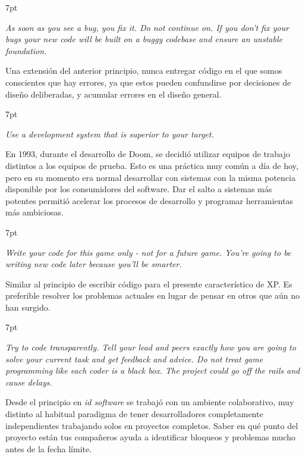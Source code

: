 \documentclass[a4paper,12pt]{report}
\newenvironment{formal}{%
	\def\FrameCommand{%
		\hspace{1pt}%
		{\color{darkblue}\vrule width 2pt}%
		{\color{formalshade}\vrule width 4pt}%
		\colorbox{formalshade}%
	}%
	\MakeFramed{\advance\hsize-\width\FrameRestore}%
	\noindent\hspace{-4.55pt}%
	\begin{adjustwidth}{}{7pt}%
		\vspace{2pt}\vspace{2pt}%
	}
	{%
		\vspace{2pt}\end{adjustwidth}\endMakeFramed%
}
\begin{document}
	\begin{formal}
		\textit{As soon as you see a bug, you fix it. Do not continue on. If you don't fix your bugs your new code will be built on a buggy codebase and ensure an unstable foundation.}        
	\end{formal}
	Una extensión del anterior principio, nunca entregar código en el que somos conscientes que hay errores, ya que estos pueden confundirse por decisiones de diseño deliberadas, y acumular errores en el diseño general.
	
	\begin{formal}
		\textit{Use a development system that is superior to your target.}       
	\end{formal}
	En 1993, durante el desarrollo de Doom, se decidió utilizar equipos de trabajo distintos a los equipos de prueba. Esto es una práctica muy común a día de hoy, pero en su momento era normal desarrollar con sistemas con la misma potencia disponible por los consumidores del software. Dar el salto a sistemas más potentes permitió acelerar los procesos de desarrollo y programar herramientas más ambiciosas.
	
	\begin{formal}
		\textit{Write your code for this game only - not for a future game. You're going to be writing new code later because you'll be smarter.}        
	\end{formal}
	Similar al principio de escribir código para el presente característico de XP. Es preferible resolver los problemas actuales en lugar de pensar en otros que aún no han surgido.
	
	\begin{formal}
		\textit{Try to code transparently. Tell your lead and peers exactly how you are going to solve your current task and get feedback and advice. Do not treat game programming like each coder is a black box. The project could go off the rails and cause delays.}        
	\end{formal}
	Desde el principio en \textit{id software} se trabajó con un ambiente colaborativo, muy distinto al habitual paradigma de tener desarrolladores completamente independientes trabajando solos en proyectos completos. Saber en qué punto del proyecto están tus compañeros ayuda a identificar bloqueos y problemas mucho antes de la fecha límite.\\
	
\end{document}

